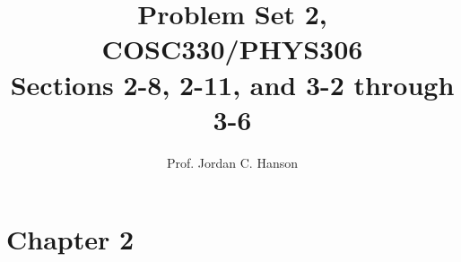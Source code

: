 \documentclass[11pt]{article}
\begin{document}
\twocolumn

\title{Problem Set 2, COSC330/PHYS306\\
Sections 2-8, 2-11, and 3-2 through 3-6}

\author{Prof. Jordan C. Hanson}

\maketitle



\section{Chapter 2}
\end{document}
